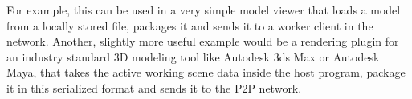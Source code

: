 For example, this can be used in a very simple model viewer that loads a model from a locally stored file, packages it and sends it to a worker client in the network. Another, slightly more useful example would be a rendering plugin for an industry standard 3D modeling tool like Autodesk 3ds Max or Autodesk Maya, that takes the active working scene data inside the host program, package it in this serialized format and sends it to the P2P network.


